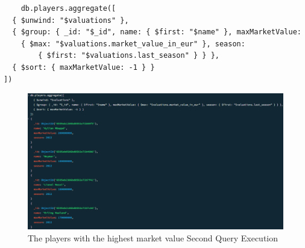 \documentclass{Configuration_Files/PoliMi3i_thesis}
\begin{document}
\begin{verbatim}
    db.players.aggregate([
  { $unwind: "$valuations" },
  { $group: { _id: "$_id", name: { $first: "$name" }, maxMarketValue: 
    { $max: "$valuations.market_value_in_eur" }, season: 
        { $first: "$valuations.last_season" } } },
  { $sort: { maxMarketValue: -1 } }
])
\end{verbatim}
\begin{figure}[htbp]
    \centering
    \includegraphics[scale=0.75]{Images/Queries/Highest_value_players/2.png}
    \caption{The players with the highest market value Second Query Execution}
\end{figure}
\end{document}

